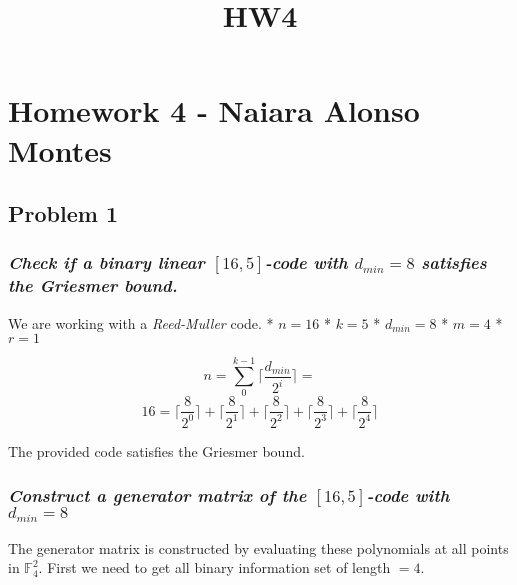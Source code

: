 \documentclass[11pt]{article}
\title{HW4}
\begin{document}
    
    \maketitle
    
    

    
    \hypertarget{homework-4---naiara-alonso-montes}{%
\section{Homework 4 - Naiara Alonso
Montes}\label{homework-4---naiara-alonso-montes}}

    \hypertarget{problem-1}{%
\subsection{Problem 1}\label{problem-1}}

    \hypertarget{check-if-a-binary-linear-165-code-with-d_min-8-satisfies-the-griesmer-bound.}{%
\subsubsection{\texorpdfstring{\emph{Check if a binary linear
\([16,5]\)-code with \(d_{min} = 8\) satisfies the Griesmer
bound.}}{Check if a binary linear {[}16,5{]}-code with d\_\{min\} = 8 satisfies the Griesmer bound.}}\label{check-if-a-binary-linear-165-code-with-d_min-8-satisfies-the-griesmer-bound.}}

    We are working with a \emph{Reed-Muller} code. * \(n = 16\) * \(k = 5\)
* \(d_{min} = 8\) * \(m = 4\) * \(r = 1\)

\[n = ∑_0^{k - 1}⌈\frac{d_{min}}{2^i}⌉ = \]
\[16 = ⌈\frac{8}{2^0}⌉ + ⌈\frac{8}{2^1}⌉ + ⌈\frac{8}{2^2}⌉ + ⌈\frac{8}{2^3}⌉ + ⌈\frac{8}{2^4}⌉\]

The provided code satisfies the Griesmer bound.

    \hypertarget{construct-a-generator-matrix-of-the-165-code-with-d_min-8}{%
\subsubsection{\texorpdfstring{\emph{Construct a generator matrix of the
\([16,5]\)-code with
\(d_{min} = 8\)}}{Construct a generator matrix of the {[}16,5{]}-code with d\_\{min\} = 8}}\label{construct-a-generator-matrix-of-the-165-code-with-d_min-8}}

    The generator matrix is constructed by evaluating these polynomials at
all points in \(𝔽^2_4\). First we need to get all binary information set
of length \(=4\).
\end{document}
